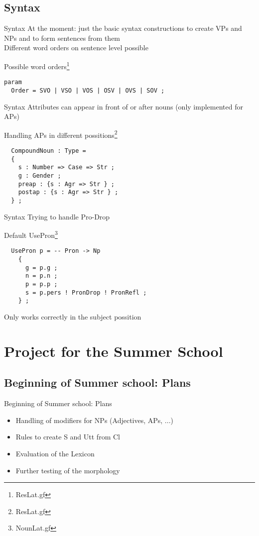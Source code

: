 \documentclass{beamer}
\begin{document}
\subsection{Syntax}
\begin{frame}[fragile]{Syntax}
At the moment: just the basic syntax constructions to create VPs and NPs and to form sentences from them \\
Different word orders on sentence level possible
\begin{example}{Possible word orders\footnote{ResLat.gf}}
\begin{Verbatim}
param
  Order = SVO | VSO | VOS | OSV | OVS | SOV ; 
\end{Verbatim}
\end{example}
\end{frame}
\begin{frame}[fragile]{Syntax}
Attributes can appear in front of or after nouns (only implemented for APs)
\begin{example}{Handling APs in different possitions\footnote{ResLat.gf}}
\begin{Verbatim}
  CompoundNoun : Type = 
  {
    s : Number => Case => Str ; 
    g : Gender ;
    preap : {s : Agr => Str } ;
    postap : {s : Agr => Str } ;
  } ;
\end{Verbatim}
\end{example}
\end{frame}
\begin{frame}[fragile]{Syntax}
Trying to handle Pro-Drop
\begin{example}{Default UsePron\footnote{NounLat.gf}}
\begin{Verbatim}
  UsePron p = -- Pron -> Np
    { 
      g = p.g ;
      n = p.n ;
      p = p.p ;
      s = p.pers ! PronDrop ! PronRefl ;
    } ;
\end{Verbatim}
\end{example}
Only works correctly in the subject possition
\end{frame}
\section{Project for the Summer School}
\subsection{Beginning of Summer school: Plans}
\begin{frame}{Beginning of Summer school: Plans}
\begin{itemize}
  \item Handling of modifiers for NPs (Adjectives, APs, ...)
  \item Rules to create S and Utt from Cl
  \item Evaluation of the Lexicon
  \item Further testing of the morphology
\end{itemize}
\end{frame}
\end{document}
